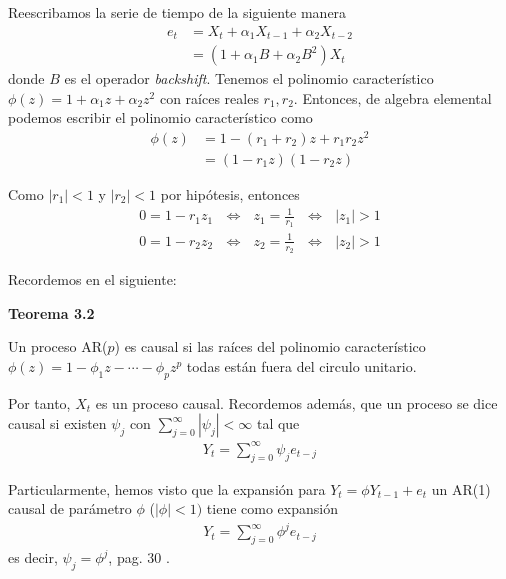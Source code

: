 \documentclass[a4paper, 11pt]{article}
\begin{document}
Reescribamos la serie de tiempo de la siguiente manera
\begin{align*}
    e_t &= X_t + \alpha_1 X_{t-1} + \alpha_2 X_{t-2} \\
    &= \left(1 + \alpha_1 B + \alpha_2 B^2  \right) X_t
\end{align*}
donde $B$ es el operador \textit{backshift}. Tenemos el polinomio característico $\phi (z) = 1+ \alpha_1 z+ \alpha_2 z^2$ con raíces reales $r_1,r_2$. Entonces, de algebra elemental podemos escribir el polinomio característico como 
\begin{align*}
    \phi(z) &= 1 - (r_1+r_2)z + r_1 r_2 z^2\\
    &= (1- r_1z)(1-r_2 z)
\end{align*}

Como $|r_1|<1$ y $|r_2| < 1$ por hipótesis, entonces
\begin{align*}
   0= 1 - r_1 z_1  \:\:\:\Leftrightarrow \:\:\: z_1 = \frac{1}{r_1}\:\:\: \Leftrightarrow \:\:\: |z_1| > 1 \\ 
   0= 1 - r_2 z_2  \:\:\:\Leftrightarrow \:\:\: z_2 = \frac{1}{r_2}\:\:\: \Leftrightarrow \:\:\: |z_2| > 1
\end{align*}

Recordemos en \cite{Chan} el siguiente:

\textbf{Teorema 3.2}

Un proceso AR($p$) es causal si las raíces del polinomio característico $\phi(z) = 1- \phi_1 z -\cdots - \phi_p z ^p$ todas están fuera del circulo unitario.

Por tanto, $X_t$ es un proceso causal. Recordemos además, que un proceso se dice causal si existen $\psi_j$ con $\sum_{j=0}^{\infty} |\psi_j | < \infty$ tal que 
\begin{align*}
    Y _t = \sum_{j=0}^{\infty} \psi_j e_{t-j} 
\end{align*}

Particularmente, hemos visto que la expansión para $Y_t = \phi Y_{t-1} + e_t $ un AR(1) causal de parámetro $\phi$ ($|\phi| < 1)$ tiene como expansión
\begin{align}
    Y_t = \sum_{j=0}^{\infty} \phi^j e_{t-j}
    \label{6.01}
\end{align}
es decir, $\psi_j = \phi^j$, pag. 30 \cite{Chan}.
\end{document}
